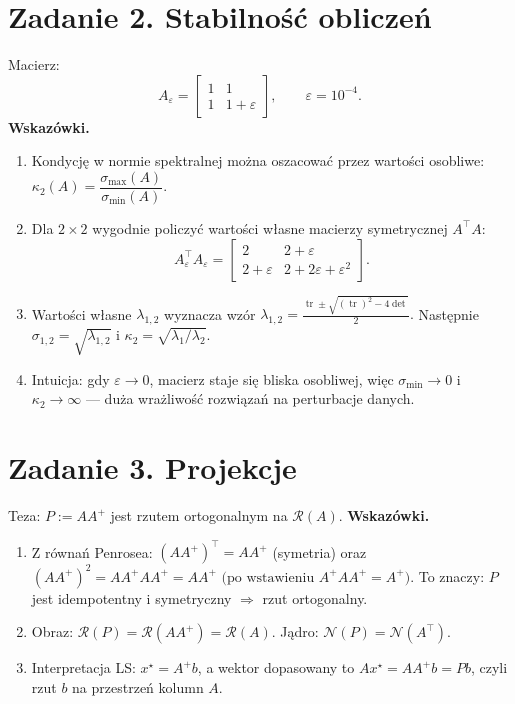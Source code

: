 \documentclass[12pt,a4paper]{article}
\begin{document}
\section*{Zadanie 2. Stabilność obliczeń}
Macierz:
\[
A_\varepsilon=\begin{bmatrix}1 & 1\\ 1 & 1+\varepsilon\end{bmatrix},\qquad \varepsilon=10^{-4}.
\]
\textbf{Wskazówki.}
\begin{enumerate}
  \item Kondycję w normie spektralnej można oszacować przez wartości osobliwe: 
  \(
  \kappa_2(A)=\dfrac{\sigma_{\max}(A)}{\sigma_{\min}(A)}.
  \)
  \item Dla $2\times 2$ wygodnie policzyć wartości własne macierzy symetrycznej $A^\top A$:
  \[
  A_\varepsilon^\top A_\varepsilon=
  \begin{bmatrix}
  2 & 2+\varepsilon\\
  2+\varepsilon & 2+2\varepsilon+\varepsilon^2
  \end{bmatrix}.
  \]
  \item Wartości własne $\lambda_{1,2}$ wyznacza wzór
  \(
  \lambda_{1,2}=\tfrac{\operatorname{tr}\pm\sqrt{(\operatorname{tr})^2-4\det}}{2}.
  \)
  Następnie $\sigma_{1,2}=\sqrt{\lambda_{1,2}}$ i $\kappa_2=\sqrt{\lambda_1/\lambda_2}$.
  \item Intuicja: gdy $\varepsilon\to 0$, macierz staje się bliska osobliwej, więc $\sigma_{\min}\to 0$ i $\kappa_2\to\infty$ — duża wrażliwość rozwiązań na perturbacje danych.
\end{enumerate}

\section*{Zadanie 3. Projekcje}
Teza: $P:=AA^+$ jest rzutem ortogonalnym na $\mathcal{R}(A)$.
\textbf{Wskazówki.}
\begin{enumerate}
  \item Z równań Penrosea: $(AA^+)^\top=AA^+$ (symetria) oraz
  \(
  (AA^+)^2=AA^+AA^+=AA^+ \text{ (po wstawieniu $A^+AA^+=A^+$)}.
  \)
  To znaczy: $P$ jest idempotentny i symetryczny $\Rightarrow$ rzut ortogonalny.
  \item Obraz: $\mathcal{R}(P)=\mathcal{R}(AA^+)=\mathcal{R}(A)$.  
  Jądro: $\mathcal{N}(P)=\mathcal{N}(A^\top)$.
  \item Interpretacja LS: $x^\star=A^+b$, a wektor dopasowany to $Ax^\star=AA^+b=Pb$, czyli rzut $b$ na przestrzeń kolumn $A$.
\end{enumerate}
\end{document}
